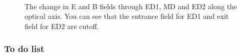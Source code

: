 \documentclass[letter,11pt]{article}
\begin{document}
\begin{figure}
\centering
	\\
	\caption{The change in E and B fields through ED1, MD and ED2 along the optical axis. You can see that the entrance field for ED1 and exit field for ED2 are cutoff.}
	\label{fig:dipoles}
\end{figure}

\subsubsection{To do list}
\end{document}
